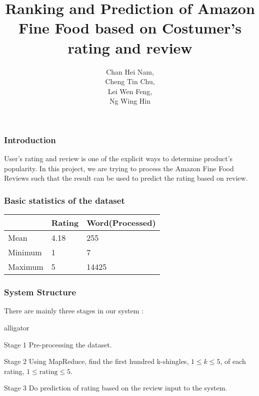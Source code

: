 \documentclass[11pt]{beamer}
\author{Chan Hei Nam, \\Cheng Tin Chu, \\Lei Wen Feng, \\Ng Wing Hin}
\title{Ranking and Prediction of Amazon Fine Food based on Costumer's rating and review}
\date{}
\begin{document}
\theoremstyle{plain}
\newtheorem{thm}{Theorem}[section] %

\theoremstyle{definition}
\newtheorem{defn}[thm]{Definition} %
\newtheorem{exmp}[thm]{Example} %
\newtheorem{prop}{Property}[section]


\begin{frame}
\titlepage
\end{frame}


\begin{frame}
\frametitle{Introduction}
User's rating and review is one of the explicit ways to determine product's popularity. In this project, we are trying to process the Amazon Fine Food Reviews such that the result can be used to predict the rating based on review.
\end{frame}

\begin{frame}
\frametitle{Basic statistics of the dataset}

\begin{tcolorbox}[colback=blue!5,colframe=blue!40!black,title=Basic statistics of the dataset]
\centering
\begin{tabular}{lll}
	\hline
	    					& Rating 	& Word(Processed)\\
	\hline
	Mean					& 4.18 		& 255\\
	Minimum       		& 1 			& 7\\
	Maximum       		& 5 			& 14425\\
	\hline
\end{tabular}
\end{tcolorbox}
\end{frame}


\begin{frame}
\frametitle{System Structure}
There are mainly three stages in our system :
\begin{labeling}{alligator}
\item [Stage 1] Pre-processing the dataset.
\item [Stage 2] Using MapReduce, find the first hundred k-shingles, \(1\leq k\leq 5\), of each rating, \(1 \leq \mbox{rating} \leq 5\).
\item [Stage 3] Do prediction of rating based on the review input to the system.
\end{labeling}
\end{frame}
\end{document}
